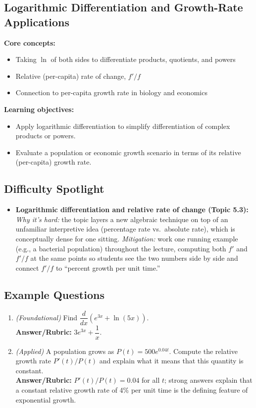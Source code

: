 \documentclass{article}
\begin{document}
\subsection{Logarithmic Differentiation and Growth-Rate Applications}
\textbf{Core concepts:}
\begin{itemize}[leftmargin=*]
  \item Taking $\ln$ of both sides to differentiate products, quotients, and powers
  \item Relative (per-capita) rate of change, $f'/f$
  \item Connection to per-capita growth rate in biology and economics
\end{itemize}
\textbf{Learning objectives:}
\begin{itemize}[leftmargin=*]
  \item Apply logarithmic differentiation to simplify differentiation of complex products or powers.
  \item Evaluate a population or economic growth scenario in terms of its relative (per-capita) growth rate.
\end{itemize}

\subsection*{Difficulty Spotlight}
\begin{itemize}[leftmargin=*]
  \item \textbf{Logarithmic differentiation and relative rate of change (Topic 5.3):} \textit{Why it's hard:} the topic layers a new algebraic technique on top of an unfamiliar interpretive idea (percentage rate vs.\ absolute rate), which is conceptually dense for one sitting. \textit{Mitigation:} work one running example (e.g., a bacterial population) throughout the lecture, computing both $f'$ and $f'/f$ at the same points so students see the two numbers side by side and connect $f'/f$ to ``percent growth per unit time.''
\end{itemize}

\subsection*{Example Questions}
\begin{enumerate}[leftmargin=*]
  \item \textit{(Foundational)} Find $\dfrac{d}{dx}\left(e^{3x} + \ln(5x)\right)$. \\
  \textbf{Answer/Rubric:} $3e^{3x} + \dfrac{1}{x}$.
  \item \textit{(Applied)} A population grows as $P(t) = 500e^{0.04t}$. Compute the relative growth rate $P'(t)/P(t)$ and explain what it means that this quantity is constant. \\
  \textbf{Answer/Rubric:} $P'(t)/P(t) = 0.04$ for all $t$; strong answers explain that a constant relative growth rate of 4\% per unit time is the defining feature of exponential growth.
\end{enumerate}
\end{document}
